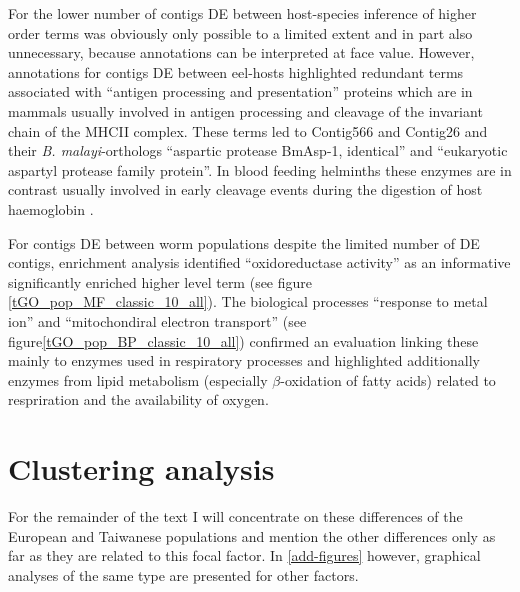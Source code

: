 For the lower number of contigs DE between host-species inference of
higher order terms was obviously only possible to a limited extent and
in part also unnecessary, because annotations can be interpreted at
face value. However, annotations for contigs DE between eel-hosts
highlighted redundant terms associated with ``antigen processing and
presentation'' proteins which are in mammals usually involved in
antigen processing and cleavage of the invariant chain of the MHCII
complex. These terms led to Contig566 and Contig26 and their
\textit{B. malayi}-orthologs ``aspartic protease BmAsp-1, identical''
and ``eukaryotic aspartyl protease family protein''. In blood feeding
helminths these enzymes are in contrast usually involved in early
cleavage events during the digestion of host haemoglobin
\cite{pmid12782060}.



For contigs DE between worm populations despite the limited number of
DE contigs, enrichment analysis identified ``oxidoreductase activity''
as an informative significantly enriched higher level term (see figure
\ref{tGO_pop_MF_classic_10_all}). The biological processes ``response
to metal ion'' and ``mitochondiral electron transport'' (see
figure\ref{tGO_pop_BP_classic_10_all}) confirmed an evaluation linking
these mainly to enzymes used in respiratory processes and highlighted
additionally enzymes from lipid metabolism (especially
$\beta$-oxidation of fatty acids) related to respriration and the
availability of oxygen.

\section{Clustering analysis}

For the remainder of the text I will concentrate on these differences
of the European and Taiwanese populations and mention the other
differences only as far as they are related to this focal factor. In
\ref{add-figures} however, graphical analyses of the same type are
presented for other factors.

